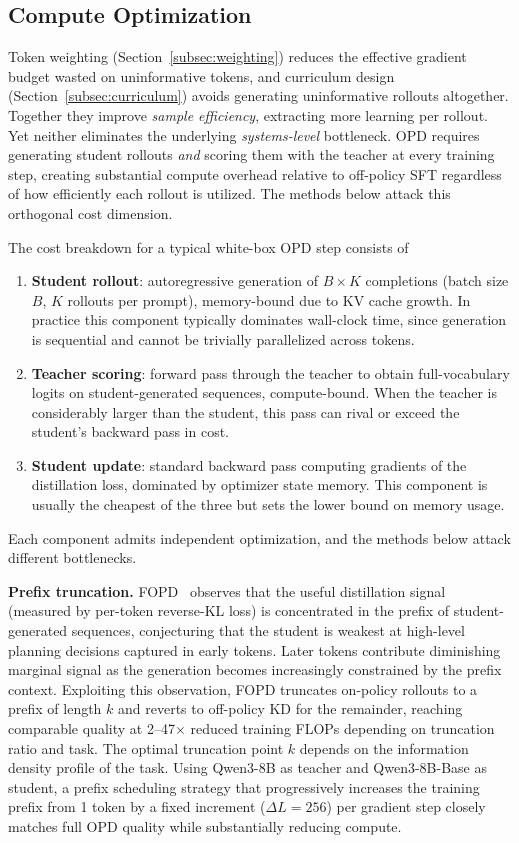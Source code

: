 \documentclass{article} %
\begin{document}
\subsection{Compute Optimization}
\label{subsec:compute}

Token weighting (Section~\ref{subsec:weighting}) reduces the effective gradient budget wasted on uninformative tokens, and curriculum design (Section~\ref{subsec:curriculum}) avoids generating uninformative rollouts altogether. Together they improve \emph{sample efficiency}, extracting more learning per rollout. Yet neither eliminates the underlying \emph{systems-level} bottleneck. OPD requires generating student rollouts \emph{and} scoring them with the teacher at every training step, creating substantial compute overhead relative to off-policy SFT regardless of how efficiently each rollout is utilized. The methods below attack this orthogonal cost dimension.

The cost breakdown for a typical white-box OPD step consists of
\begin{enumerate}[nosep]
    \item \textbf{Student rollout}: autoregressive generation of $B \times K$ completions (batch size $B$, $K$ rollouts per prompt), memory-bound due to KV cache growth. In practice this component typically dominates wall-clock time, since generation is sequential and cannot be trivially parallelized across tokens.
    \item \textbf{Teacher scoring}: forward pass through the teacher to obtain full-vocabulary logits on student-generated sequences, compute-bound. When the teacher is considerably larger than the student, this pass can rival or exceed the student's backward pass in cost.
    \item \textbf{Student update}: standard backward pass computing gradients of the distillation loss, dominated by optimizer state memory. This component is usually the cheapest of the three but sets the lower bound on memory usage.
\end{enumerate}
Each component admits independent optimization, and the methods below attack different bottlenecks.

\textbf{Prefix truncation.} FOPD~\citep{2602.15260} observes that the useful distillation signal (measured by per-token reverse-KL loss) is concentrated in the prefix of student-generated sequences, conjecturing that the student is weakest at high-level planning decisions captured in early tokens. Later tokens contribute diminishing marginal signal as the generation becomes increasingly constrained by the prefix context. Exploiting this observation, FOPD truncates on-policy rollouts to a prefix of length $k$ and reverts to off-policy KD for the remainder, reaching comparable quality at 2--47$\times$ reduced training FLOPs depending on truncation ratio and task. The optimal truncation point $k$ depends on the information density profile of the task. Using Qwen3-8B as teacher and Qwen3-8B-Base as student, a prefix scheduling strategy that progressively increases the training prefix from 1 token by a fixed increment ($\Delta L = 256$) per gradient step closely matches full OPD quality while substantially reducing compute.
\end{document}
